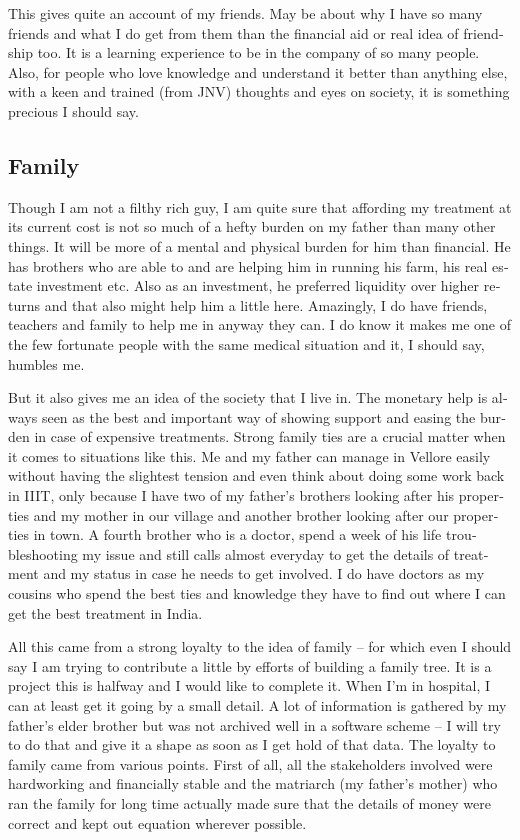 \begin{english}
This gives quite an account of my friends. May be  about why I have so many friends and what I do get from 
them than the financial aid or real idea of friendship too. It is a learning experience to be in the company 
of so many people. Also, for people who love knowledge and understand it better than anything else, with a keen 
and trained (from JNV) thoughts and eyes on society, it is something precious I should say.   


\subsection*{Family}
   
Though I am not a filthy rich guy, I am quite sure that affording my treatment at its current cost is not so 
much of a hefty burden on my father than many other things. It will be more of a mental and physical 
burden for him than financial. He has brothers who are able to and are helping him in running his farm, 
his real estate investment etc. Also as an investment, he preferred liquidity over higher returns 
and that also might help him a little here. Amazingly, I do have friends, teachers and family to 
help me in anyway they can. I do know it makes me one of the few fortunate people with the same 
medical situation and it, I should say, humbles me. 

But it also gives me an idea of the society that I live in. The monetary help is always seen as the best 
and important way of showing support and easing the burden in case of expensive treatments. 
Strong family ties are a crucial matter when it comes to situations like this. Me and my father can 
manage in Vellore easily without having the slightest tension and even think about doing some work back in IIIT, only 
because I have two of my father's brothers looking after his properties and my mother in our 
village and another brother looking after our properties in town. A fourth brother who is a doctor, 
spend a week of his life troubleshooting my issue and still calls almost everyday to get the 
details of treatment and my status in case he needs to get involved. I do have doctors as my cousins 
who spend the best ties and knowledge they have to find out where I can get the best treatment in India. 

All this came from a strong loyalty to the idea of family -- for which even I should say I am
trying to contribute a little by efforts of building a family tree. It is a project this is halfway and I would 
like to complete it. When I'm in hospital, I can at least get it going by a small detail. A lot of
information is gathered by my father's elder brother but was not archived well in a software scheme 
-- I will try to do that and give it a shape as soon as I get hold of that data. The loyalty to 
family came from various points. First of all, all the stakeholders involved were hardworking and
financially stable and the matriarch (my father's mother) who ran the family for long time actually 
made sure that the details of money were correct and kept out equation wherever possible. 


\end{english}
